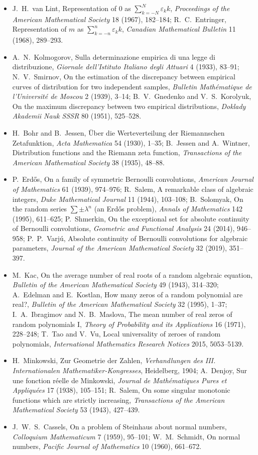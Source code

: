 \begin{itemize}
\item J.~H.~van Lint, Representation of $0$ as $\sum_{k=-N}^N\varepsilon_kk$, \emph{Proceedings of the American Mathematical Society} 18 (1967), 182--184; R.~C.~Entringer, Representation
of $m$ as $\sum_{k=-n}^n\varepsilon_kk$, \emph{Canadian Mathematical Bulletin} 11 (1968), 289--293.
\item A.~N.~Kolmogorov, Sulla determinazione empirica di una legge di distribuzione, \emph{Giornale dell'Istituto Italiano degli Attuari} 4 (1933), 83--91; N.~V.~Smirnov, On the
estimation of the discrepancy between empirical curves of distribution for two independent samples, \emph{Bulletin Mathématique de l'Université de Moscou} 2 (1939), 3--14;
B.~V.~Gnedenko and V.~S.~Korolyuk, On the maximum discrepancy between two empirical distributions, \emph{Doklady Akademii Nauk SSSR} 80 (1951), 525--528.
\item H.~Bohr and B.~Jessen, Über die Werteverteilung der Riemannschen Zetafunktion, \emph{Acta Mathematica} 54 (1930), 1--35; B.~Jessen and A.~Wintner, Distribution functions
and the Riemann zeta function, \emph{Transactions of the American Mathematical Society} 38 (1935), 48--88.
\item P.~Erdős, On a family of symmetric Bernoulli convolutions, \emph{American Journal of Mathematics} 61 (1939), 974--976; R.~Salem, A remarkable class of algebraic integers,
\emph{Duke Mathematical Journal} 11 (1944), 103--108; B.~Solomyak, On the random series $\sum\pm\lambda^n$ (an Erdős problem), \emph{Annals of Mathematics} 142 (1995), 611--625;
P.~Shmerkin, On the exceptional set for absolute continuity of Bernoulli convolutions, \emph{Geometric and Functional Analysis} 24 (2014), 946--958; P.~P.~Varjú, Absolute continuity
of Bernoulli convolutions for algebraic parameters, \emph{Journal of the American Mathematical Society} 32 (2019), 351--397.
\item M.~Kac, On the average number of real roots of a random algebraic equation, \emph{Bulletin of the American Mathematical Society} 49 (1943), 314--320; A.~Edelman and E.~Kostlan,
How many zeros of a random polynomial are real?, \emph{Bulletin of the American Mathematical Society} 32 (1995), 1--37; I.~A.~Ibragimov and N.~B.~Maslova, The mean number of real
zeros of random polynomials I, \emph{Theory of Probability and its Applications} 16 (1971), 228--248; T.~Tao and V.~Vu, Local universality of zeroes of random polynomials,
\emph{International Mathematics Research Notices} 2015, 5053--5139.
\item H.~Minkowski, Zur Geometrie der Zahlen, \emph{Verhandlungen des III. Internationalen Mathematiker-Kongresses}, Heidelberg, 1904; A.~Denjoy, Sur une fonction
réelle de Minkowski, \emph{Journal de Mathématiques Pures et Appliquées} 17 (1938), 105--151; R.~Salem, On some singular monotonic functions which are strictly increasing,
\emph{Transactions of the American Mathematical Society} 53 (1943), 427--439.
\item J.~W.~S.~Cassels, On a problem of Steinhaus about normal numbers, \emph{Colloquium Mathematicum} 7 (1959), 95--101; W.~M.~Schmidt, On normal numbers,
\emph{Pacific Journal of Mathematics} 10 (1960), 661--672.
\end{itemize}
